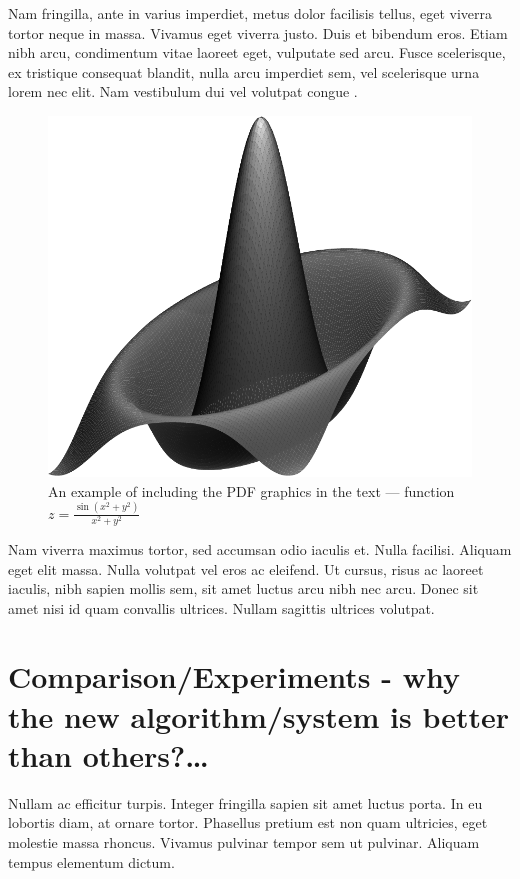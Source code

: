 \documentclass[10pt]{article}
\begin{document}
Nam fringilla, ante in varius imperdiet, metus dolor facilisis tellus, eget viverra tortor neque in massa. Vivamus eget viverra justo. Duis et bibendum eros. Etiam nibh arcu, condimentum vitae laoreet eget, vulputate sed arcu. Fusce scelerisque, ex tristique consequat blandit, nulla arcu imperdiet sem, vel scelerisque urna lorem nec elit. Nam vestibulum dui vel volutpat congue \cite{mixture}.

\begin{figure}[!ht]
\centering
\includegraphics[scale=.4]{surfz}
\caption{An example of including the PDF graphics in the text ---
function $z=\frac{\sin(x^2+y^2)}{x^2+y^2}$}
\label{rys:surf}
\end{figure}

Nam viverra maximus tortor, sed accumsan odio iaculis et. Nulla facilisi. Aliquam eget elit massa. Nulla volutpat vel eros ac eleifend. Ut cursus, risus ac laoreet iaculis, nibh sapien mollis sem, sit amet luctus arcu nibh nec arcu. Donec sit amet nisi id quam convallis ultrices. Nullam sagittis ultrices volutpat. 

\section{Comparison/Experiments - why the new algorithm/system is better than others?\ldots}

Nullam ac efficitur turpis. Integer fringilla sapien sit amet luctus porta. In eu lobortis diam, at ornare tortor. Phasellus pretium est non quam ultricies, eget molestie massa rhoncus. Vivamus pulvinar tempor sem ut pulvinar. Aliquam tempus elementum dictum.
\end{document}
